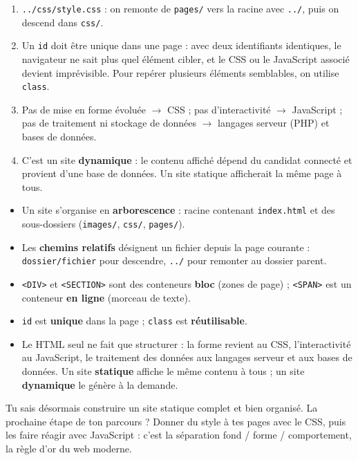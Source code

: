\documentclass[11pt]{article}
\begin{document}
\begin{corrige}[Exercice]
\begin{enumerate}
  \item \texttt{../css/style.css} : on remonte de \texttt{pages/} vers la racine avec \texttt{../}, puis on descend dans \texttt{css/}.
  \item Un \texttt{id} doit être unique dans une page : avec deux identifiants identiques, le navigateur ne sait plus quel élément cibler, et le CSS ou le JavaScript associé devient imprévisible. Pour repérer plusieurs éléments semblables, on utilise \texttt{class}.
  \item Pas de mise en forme évoluée $\rightarrow$ CSS ; pas d'interactivité $\rightarrow$ JavaScript ; pas de traitement ni stockage de données $\rightarrow$ langages serveur (PHP) et bases de données.
  \item C'est un site \textbf{dynamique} : le contenu affiché dépend du candidat connecté et provient d'une base de données. Un site statique afficherait la même page à tous.
\end{enumerate}
\end{corrige}

\begin{aretenir}
\begin{itemize}
  \item Un site s'organise en \textbf{arborescence} : racine contenant \texttt{index.html} et des sous-dossiers (\texttt{images/}, \texttt{css/}, \texttt{pages/}).
  \item Les \textbf{chemins relatifs} désignent un fichier depuis la page courante : \texttt{dossier/fichier} pour descendre, \texttt{../} pour remonter au dossier parent.
  \item \texttt{<DIV>} et \texttt{<SECTION>} sont des conteneurs \textbf{bloc} (zones de page) ; \texttt{<SPAN>} est un conteneur \textbf{en ligne} (morceau de texte).
  \item \texttt{id} est \textbf{unique} dans la page ; \texttt{class} est \textbf{réutilisable}.
  \item Le HTML seul ne fait que structurer : la forme revient au CSS, l'interactivité au JavaScript, le traitement des données aux langages serveur et aux bases de données. Un site \textbf{statique} affiche le même contenu à tous ; un site \textbf{dynamique} le génère à la demande.
\end{itemize}
\end{aretenir}

Tu sais désormais construire un site statique complet et bien organisé. La prochaine étape de ton parcours ? Donner du style à tes pages avec le CSS, puis les faire réagir avec JavaScript : c'est la séparation fond / forme / comportement, la règle d'or du web moderne.
\end{document}

